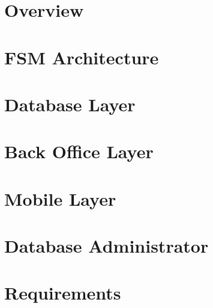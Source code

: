 
\newcommand*{\archi}{chapters/architecture/}

\section{Overview}
	
\section{FSM Architecture}
	
\section{Database Layer}
	
\section{Back Office Layer}
	
\newpage
\section{Mobile Layer}
	
\section{Database Administrator}
	
\section{Requirements}
	
